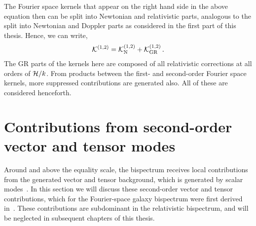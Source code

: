The Fourier space kernels that appear on the right hand side in the above equation then can be split into Newtonian and relativistic parts, analogous to the split into Newtonian and Doppler parts as considered in the first part of this thesis. Hence, we can write, 
\begin{equation}
	\mathcal{K}^{(1,2)} = \mathcal{K}^{(1,2)}_{\mathrm{N}} + \mathcal{K}^{(1,2)}_{\mathrm{GR}}\,.
\end{equation}
The GR parts of the kernels here are composed of all relativistic corrections at all orders of $\mathcal{H}/k$. From products between the first- and second-order Fourier space kernels, more suppressed contributions are generated also. All of these are considered henceforth.

\section{Contributions from second-order vector and tensor modes}\label{sec:tensorvector}

Around and above the equality scale, the bispectrum receives local contributions from the generated vector and tensor background, which is generated by scalar modes~\cite{Tomita:2005et,Mollerach:2003nq,Ananda:2006af,Lu:2007cj,Baumann:2007zm,Hwang:2017oxa,Lu:2008ju}. In this section we will discuss these second-order vector and tensor contributions, which for the Fourier-space galaxy bispectrum were first derived in~\cite{Jolicoeur:2018blf}. These contributions are subdominant in the relativistic bispectrum, and will be neglected in subsequent chapters of this thesis. 

